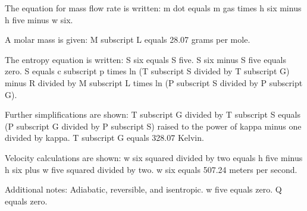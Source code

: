 The equation for mass flow rate is written:  
m dot equals m gas times h six minus h five minus w six.  

A molar mass is given:  
M subscript L equals 28.07 grams per mole.  

The entropy equation is written:  
S six equals S five.  
S six minus S five equals zero.  
S equals c subscript p times ln (T subscript S divided by T subscript G) minus R divided by M subscript L times ln (P subscript S divided by P subscript G).  

Further simplifications are shown:  
T subscript G divided by T subscript S equals (P subscript G divided by P subscript S) raised to the power of kappa minus one divided by kappa.  
T subscript G equals 328.07 Kelvin.  

Velocity calculations are shown:  
w six squared divided by two equals h five minus h six plus w five squared divided by two.  
w six equals 507.24 meters per second.  

Additional notes:  
Adiabatic, reversible, and isentropic.  
w five equals zero.  
Q equals zero.